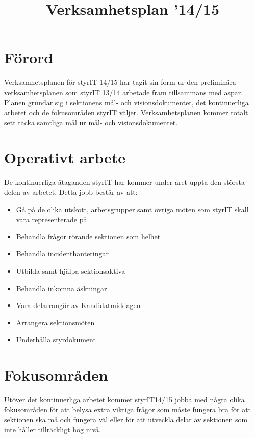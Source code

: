 \documentclass[11pt, includeaddress]{classes/cthit}
\begin{document}
\title{Verksamhetsplan \STYRITFULL{}'14/15}
\maketitle

\thispagestyle{empty}

\newpage

\makeheadfoot%

\setcounter{tocdepth}{2}
\setcounter{page}{1}
\tableofcontents

\newpage

\section{Förord}
Verksamhetsplanen för styrIT 14/15 har tagit sin form ur den preliminära verksamhetsplanen som styrIT 13/14 arbetade fram tillsammans med aspar. Planen grundar sig i sektionens mål- och visionsdokumentet, det kontinuerliga arbetet och de fokusområden styrIT väljer. Verksamhetsplanen kommer totalt sett täcka samtliga mål ur mål- och visionsdokumentet.


\section{Operativt arbete}
De kontinuerliga åtaganden styrIT har kommer under året uppta den största delen av arbetet. Detta jobb består av att:
\begin{itemize}
	\item Gå på de olika utskott, arbetsgrupper samt övriga möten som styrIT skall vara representerade på
	\item Behandla frågor rörande sektionen som helhet
	\item Behandla incidenthanteringar
	\item Utbilda samt hjälpa sektionsaktiva
	\item Behandla inkomna äskningar
	\item Vara delarrangör av Kandidatmiddagen
	\item Arrangera sektionsmöten
	\item Underhålla styrdokument
\end{itemize}

\section{Fokusområden}
Utöver det kontinuerliga arbetet kommer styrIT14/15 jobba med några olika fokusområden för att belysa extra viktiga frågor som måste fungera bra för att sektionen ska må och fungera väl eller för att utveckla delar av sektionen som inte håller tillräckligt hög nivå.
\end{document}
